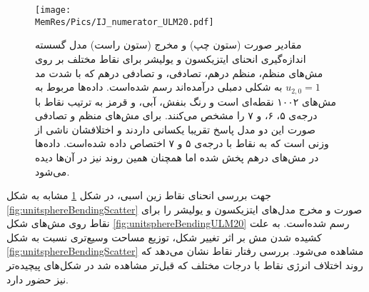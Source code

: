 \begin{figure}[tbhp]
\begin{center}
\texttt{[image: \\MemRes/Pics/IJ\_numerator\_ULM20.pdf]}
\caption{
مقادیر صورت (ستون چپ) و مخرج (ستون راست) مدل گسسته اندازه‌گیری انحنای ایتزیکسون و یولیشر برای نقاط مختلف بر روی مش‌های منظم، منظم درهم، تصادفی، و تصادفی درهم که با شدت مد 
$u_{2,0}=1$
به شکلی دمبلی درآمده‌اند رسم شده‌است. داده‌ها مربوط به مش‌های ۱۰۰۲ نقطه‌ای است و  رنگ بنفش، آبی، و قرمز به ترتیب  نقاط با درجه‌ی ۵، ۶، و ۷ را مشخص می‌کنند. برای مش‌های منظم و تصادفی صورت این دو مدل پاسخ تقریبا یکسانی داردند و اختلافشان ناشی از وزنی است که به نقاط با درجه‌ی ۵ و ۷ اختصاص داده شده‌است. داده‌ها در مش‌های درهم پخش شده اما همچنان همین روند نیز در آن‌ها دیده می‌شود.
}
\label{fig:ULM20BendingScatter}
\end{center}
\end{figure}

جهت بررسی انحنای نقاط زین اسبی، در شکل 
\ref{fig:ULM20BendingScatter}
مشابه به شکل
\ref{fig:unitsphereBendingScatter}
صورت و مخرج مدل‌های ایتزیکسون و یولیشر را برای نقاط روی مش‌های شکل 
\ref{fig:unitsphereBendingULM20}
رسم شده‌است. به علت کشیده شدن مش‌ بر اثر تغییر شکل، توزیع مساحت وسیع‌تری نسبت به شکل 
\ref{fig:unitsphereBendingScatter}
مشاهده می‌شود. بررسی رفتار نقاط نشان می‌دهد که روند اختلاف انرژی نقاط با درجات مختلف که قبل‌تر مشاهده شد در شکل‌های پیچیده‌تر نیز حضور دارد.




